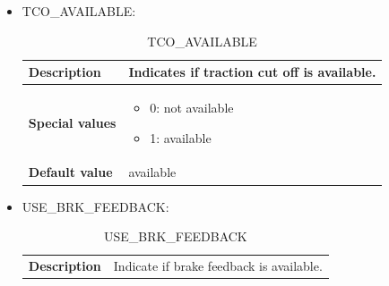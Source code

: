 \documentclass{template/openetcs}
\begin{document}
\begin{itemize}
\begin{longtable}{|l|l|}
				\hline
				
			\end{longtable}
			
		\item TCO\_AVAILABLE:
									
			\begin{longtable}{|l|l|}
				\caption{TCO\_AVAILABLE}\\ 
				\hline
				
					\begin{minipage}[t]{0.22\linewidth} \textbf{Description}	\end{minipage} 
				&	\begin{minipage}[t]{0.78\linewidth} Indicates if traction cut off is available. \end{minipage} \\
				
				\hline
																																									
					\begin{minipage}[t]{0.22\linewidth} \textbf{Special values}	\end{minipage} 
				&	\begin{minipage}[t]{0.78\linewidth} \begin{itemize} \item 0: not available \item 1: available \end{itemize} \end{minipage} \\
				
				\hline
				
					\begin{minipage}[t]{0.22\linewidth} \textbf{Default value}	\end{minipage} 
				&	\begin{minipage}[t]{0.78\linewidth} available \end{minipage} \\
				
				\hline
				
			\end{longtable}
			
		\item USE\_BRK\_FEEDBACK:
											
			\begin{longtable}{|l|l|}
				\caption{USE\_BRK\_FEEDBACK}\\ 
				\hline
				
					\begin{minipage}[t]{0.22\linewidth} \textbf{Description}	\end{minipage} 
				&	\begin{minipage}[t]{0.78\linewidth} Indicate if brake feedback is available. \end{minipage} \\
				

\end{longtable}
\end{itemize}
\end{document}
